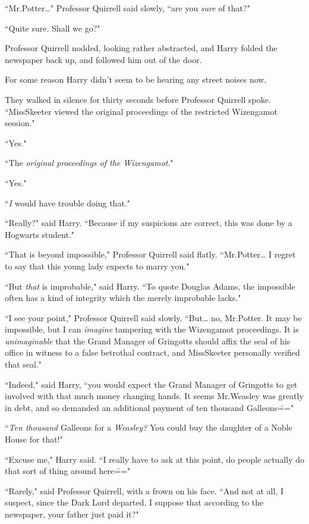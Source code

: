 ``Mr.\?Potter{\ldots}" Professor Quirrell said slowly, ``are you \emph{sure} of that?"

``Quite sure. Shall we go?"

Professor Quirrell nodded, looking rather abstracted, and Harry folded the newspaper back up, and followed him out of the door.

For some reason Harry didn't seem to be hearing any street noises now.

They walked in silence for thirty seconds before Professor Quirrell spoke. ``Miss\?Skeeter viewed the original proceedings of the restricted Wizengamot session."

``Yes."

``The \emph{original proceedings of the Wizengamot}."

``Yes."

``\emph{I} would have trouble doing that."

``Really?" said Harry. ``Because if my suspicions are correct, this was done by a Hogwarts student."

``That is beyond impossible," Professor Quirrell said flatly. ``Mr.\?Potter{\ldots} I regret to say that this young lady expects to marry you."

``But \emph{that} is improbable," said Harry. ``To quote Douglas Adams, the impossible often has a kind of integrity which the merely improbable lacks."

``I see your point," Professor Quirrell said slowly. ``But{\ldots} no, Mr.\?Potter. It may be impossible, but I can \emph{imagine} tampering with the Wizengamot proceedings. It is \emph{unimaginable} that the Grand Manager of Gringotts should affix the seal of his office in witness to a false betrothal contract, and Miss\?Skeeter personally verified that seal."

``Indeed," said Harry, ``you would expect the Grand Manager of Gringotts to get involved with that much money changing hands. It seems Mr.\?Weasley was greatly in debt, and so demanded an additional payment of ten thousand Galleons\==="

``\emph{Ten thousand} Galleons for a \emph{Weasley?} You could buy the daughter of a Noble House for that!"

``Excuse me," Harry said. ``I really have to ask at this point, do people actually do that sort of thing around here\==="

``Rarely," said Professor Quirrell, with a frown on his face. ``And not at all, I suspect, since the Dark Lord departed. I suppose that according to the newspaper, your father just paid it?"

